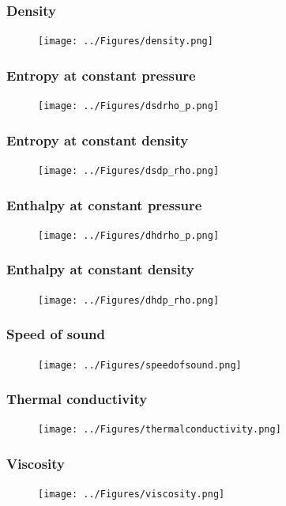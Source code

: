 \documentclass{beamer}
\begin{document}
\begin{frame}\frametitle{Density}
\begin{figure}
\texttt{[image: ../Figures/density.png]}
\end{figure}
\end{frame}


\begin{frame}\frametitle{Entropy at constant pressure}
\begin{figure}
\texttt{[image: ../Figures/dsdrho\_p.png]}
\end{figure}
\end{frame}

\begin{frame}\frametitle{Entropy at constant density}
\begin{figure}
\texttt{[image: ../Figures/dsdp\_rho.png]}
\end{figure}
\end{frame}


\begin{frame}\frametitle{Enthalpy at constant pressure}
\begin{figure}
\texttt{[image: ../Figures/dhdrho\_p.png]}
\end{figure}
\end{frame}

\begin{frame}\frametitle{Enthalpy at constant density}
\begin{figure}
\texttt{[image: ../Figures/dhdp\_rho.png]}
\end{figure}
\end{frame}


\begin{frame}\frametitle{Speed of sound}
\begin{figure}
\texttt{[image: ../Figures/speedofsound.png]}
\end{figure}
\end{frame}

\begin{frame}\frametitle{Thermal conductivity}
\begin{figure}
\texttt{[image: ../Figures/thermalconductivity.png]}
\end{figure}
\end{frame}

\begin{frame}\frametitle{Viscosity}
\begin{figure}
\texttt{[image: ../Figures/viscosity.png]}
\end{figure}
\end{frame}
\end{document}
